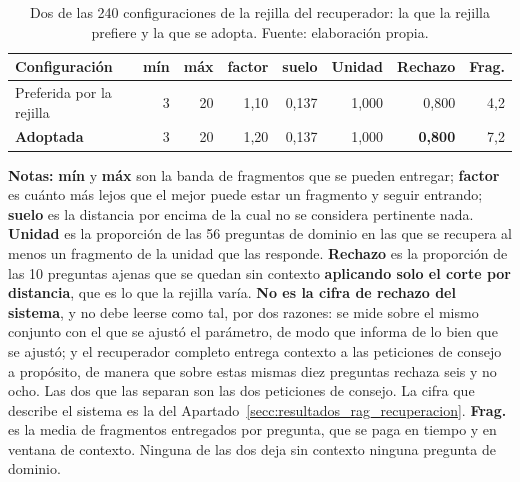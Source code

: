 
\begin{table}[htbp]
  \centering
  \small
  \caption[\textcolor{borrador2}{Rejilla de parámetros del recuperador}]{%
    \textcolor{borrador2}{Dos de las 240 configuraciones de la rejilla del
      recuperador: la que la rejilla prefiere y la que se adopta.
      Fuente: elaboración propia.}}
  \label{tab:barrido_recuperador}
  \begin{tabular}{@{}lrrrrrrr@{}}
    \toprule
    \textcolor{borrador2}{\textbf{Configuración}} & \textbf{mín} & \textbf{máx}
      & \textbf{factor} & \textbf{suelo} & \textbf{Unidad} & \textbf{Rechazo}
      & \textbf{Frag.} \\
    \midrule
    \textcolor{borrador2}{Preferida por la rejilla} & 3 & 20 & 1,10 & 0,137 & 1,000 & 0,800 & 4,2 \\
    \textcolor{borrador2}{\textbf{Adoptada}}   & 3 & 20 & 1,20 & 0,137 & 1,000 & \textbf{0,800} & 7,2 \\
    \bottomrule
  \end{tabular}
  \begin{minipage}{0.95\textwidth}
    \vspace{4pt}
    \tiny
    \textcolor{borrador2}{\textbf{Notas:} \textbf{mín} y \textbf{máx} son la
      banda de fragmentos que se pueden entregar; \textbf{factor} es cuánto más
      lejos que el mejor puede estar un fragmento y seguir entrando;
      \textbf{suelo} es la distancia por encima de la cual no se considera
      pertinente nada. \textbf{Unidad} es la proporción de las 56 preguntas de
      dominio en las que se recupera al menos un fragmento de la unidad que las
      responde. \textbf{Rechazo} es la proporción de las 10 preguntas ajenas que
      se quedan sin contexto \textbf{aplicando solo el corte por distancia}, que
      es lo que la rejilla varía. \textbf{No es la cifra de rechazo del
        sistema}, y no debe leerse como tal, por dos razones: se mide sobre el
      mismo conjunto con el que se ajustó el parámetro, de modo que informa de lo
      bien que se ajustó; y el recuperador completo entrega contexto a las
      peticiones de consejo a propósito, de manera que sobre estas mismas diez
      preguntas rechaza seis y no ocho. Las dos que las separan son las dos
      peticiones de consejo. La cifra que describe el sistema es la del
      Apartado~\ref{secc:resultados_rag_recuperacion}.
      \textbf{Frag.} es la media de fragmentos entregados por pregunta, que se
      paga en tiempo y en ventana de contexto. Ninguna de las dos deja sin
      contexto ninguna pregunta de dominio.}
  \end{minipage}
\end{table}
